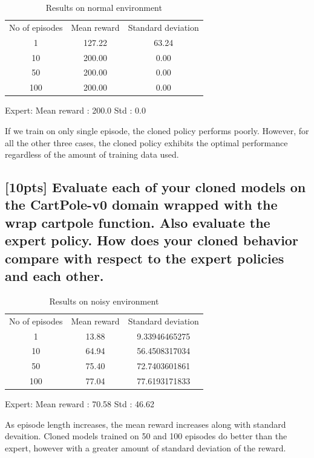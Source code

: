 \documentclass{article}
\begin{document}
\begin{table}[H]
\centering
\caption{Results on normal environment}
\label{my-label3}
\begin{tabular}{ccc}
No of episodes & Mean reward & Standard deviation \\
1              & 127.22       & 63.24    \\
10            & 200.00       & 0.00      \\
50            & 200.00       & 0.00    \\
100          & 200.00       & 0.00     
\end{tabular}
\end{table}

Expert:
Mean reward : 200.0
Std : 0.0

If we train on only single episode, the cloned policy performs poorly. However, for all the other three cases, the cloned policy exhibits the optimal performance regardless of the amount of training data used. 

\subsection{[10pts] Evaluate each of your cloned models on the CartPole-v0 domain wrapped with the wrap cartpole function. Also evaluate the expert policy. How does your cloned behavior compare with respect to the expert policies and each other.}

\begin{table}[H]
\centering
\caption{Results on noisy environment}
\label{my-label4}
\begin{tabular}{ccc}
No of episodes & Mean reward & Standard deviation \\
1            & 13.88       & 9.33946465275      \\
10           & 64.94       & 56.4508317034      \\
50           & 75.40       & 72.7403601861      \\
100          & 77.04       & 77.6193171833      
\end{tabular}
\end{table}

Expert:
Mean reward : 70.58
Std : 46.62

As episode length increases, the mean reward increases along with standard devaition. 
Cloned models trained on 50 and 100 episodes do better than the expert, however with a greater amount of standard deviation of the reward. 
\end{document}
